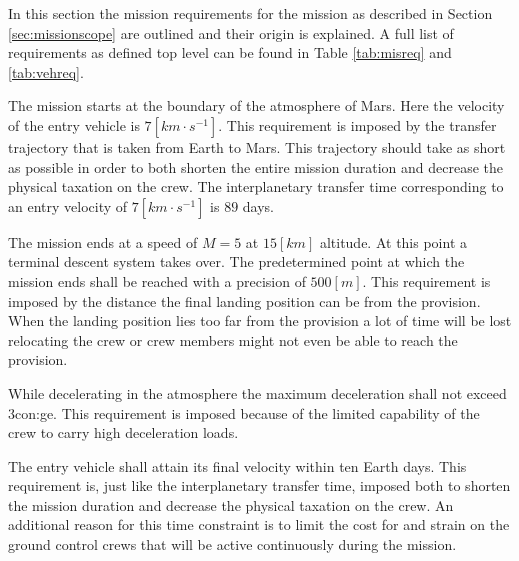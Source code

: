 In this section the mission requirements for the mission as described in Section \ref{sec:missionscope} are outlined and their origin is explained. A full list of requirements as defined top level can be found in Table \ref{tab:misreq} and \ref{tab:vehreq}.

The mission starts at the boundary of the atmosphere of Mars. Here the velocity of the entry vehicle is $7 \left[km \cdot s^{-1} \right]$. This requirement is imposed by the transfer trajectory that is taken from Earth to Mars. This trajectory should take as short as possible in order to both shorten the entire mission duration and decrease the physical taxation on the crew. The interplanetary transfer time corresponding to an entry velocity of $7 \left[km \cdot s^{-1} \right]$ is $89$ days. 

The mission ends at a speed of $M=5$ at $15 \left[km\right]$ altitude. At this point a terminal descent system takes over. The predetermined point at which the mission ends shall be reached with a precision of $500 \left[m\right]$. This requirement is imposed by the distance the final landing position can be from the provision. When the landing position lies too far from the provision a lot of time will be lost relocating the crew or crew members might not even be able to reach the provision.

While decelerating in the atmosphere the maximum deceleration shall not exceed 3\gls{con:ge}. This requirement is imposed because of the limited capability of the crew to carry high deceleration loads.

The entry vehicle shall attain its final velocity within ten Earth days. This requirement is, just like the interplanetary transfer time, imposed both to shorten the mission duration and decrease the physical taxation on the crew. An additional reason for this time constraint is to limit the cost for and strain on the ground control crews that will be active continuously during the mission.


